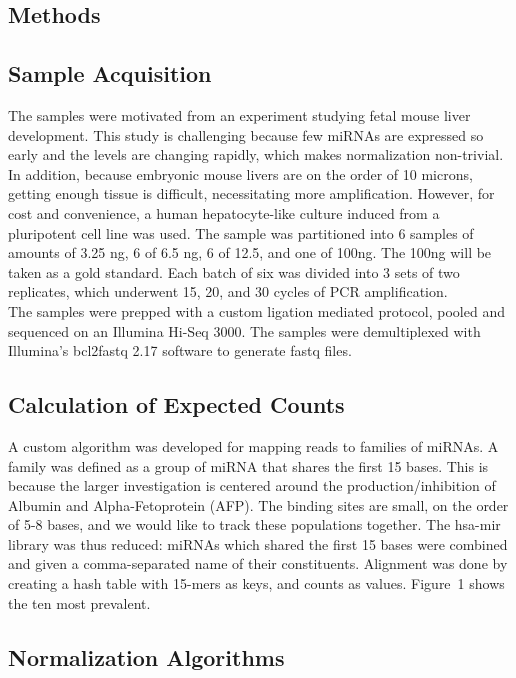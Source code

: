 \documentclass{bioinfo}
\begin{document}
\begin{methods}
\section{Methods}
\subsection{Sample Acquisition}
The samples were motivated from an experiment studying fetal mouse liver development. This study is challenging because few miRNAs are expressed so early and the levels are changing rapidly, which makes normalization non-trivial. In addition, because embryonic mouse livers are on the order of 10 microns, getting enough tissue is difficult, necessitating more amplification.\citep{Xu10}  However, for cost and convenience, a human hepatocyte-like culture induced from a pluripotent cell line was used. The sample was partitioned into 6 samples of amounts of 3.25 ng, 6 of 6.5 ng, 6 of 12.5, and one of 100ng. The 100ng will be taken as a gold standard. Each batch of six was divided into 3 sets of two replicates, which underwent 15, 20, and 30 cycles of PCR amplification.\vspace{4pt} \\  
The samples were prepped with a custom ligation mediated protocol, pooled and sequenced on an Illumina Hi-Seq 3000.  The samples were demultiplexed with Illumina's bcl2fastq 2.17 software to generate fastq files. 
\subsection{Calculation of Expected Counts}
A custom algorithm was developed for mapping reads to families of miRNAs. A family was defined as a group of miRNA that shares the first 15 bases. This is because the larger investigation is centered around the production/inhibition of Albumin and Alpha-Fetoprotein (AFP). The binding sites are small, on the order of 5-8 bases, and we would like to track these populations together. The hsa-mir library was thus reduced: miRNAs which shared the first 15 bases were combined and given a comma-separated name of their constituents.  Alignment was done by creating a hash table with 15-mers as keys, and counts as values.
Figure~1 \vphantom{\ref{fig:1}} shows the ten most prevalent. \\

\vspace{4pt} 
  
\subsection{Normalization Algorithms}

\end{methods}
\end{document}
